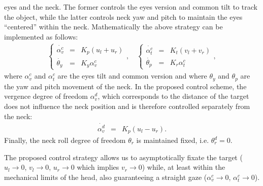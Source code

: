 eyes and the neck. The former controls 
the eyes version and common tilt to track the object, while the latter
controls neck yaw and pitch to maintain the eyes ``centered'' within 
the neck. Mathematically the above strategy can be implemented 
as follows:
%
\begin{eqnarray} \label{Eq:HeadEyeControl}
\left\{\begin{matrix}
\dot {\alpha_v^c} &=&   K_p (u_l + u_r)\\
\dot {\theta_y} &=&   K_y \alpha_v^c 
\end{matrix}
\right.,\quad
\left\{ \begin{matrix}
\dot {\alpha_t^c} &=&   K_t (v_l + v_r)\\
\dot {\theta_p} &=&   K_r \alpha_t^c
\end{matrix} \right.,
\end{eqnarray}
%
where $\alpha_v^c$ and $\alpha_t^c$ are the eyes tilt and common version and 
where $\theta_y$ and $\theta_p$ are the yaw and pitch movement of the neck. 
In the proposed control scheme, the vergence degree of freedom $\alpha_v^d$, 
which corresponds to the distance of the target does not influence 
the neck position and is therefore controlled separately from the neck:
\begin{eqnarray} 
\dot {\alpha_v^d} &=&   K_p (u_l - u_r).
\end{eqnarray}
Finally, the neck roll degree of freedom $\theta_r$ is maintained fixed, 
i.e. $\theta_r^d=0$.

The proposed control strategy allows us to asymptotically fixate the target 
($u_l \rightarrow 0$, $v_l \rightarrow 0$, $u_r \rightarrow 0$ which 
implies $v_r \rightarrow 0$) while, at least within the mechanical limits 
of the head, also guaranteeing a straight gaze 
($\alpha_v^c \rightarrow 0$, $\alpha_t^c \rightarrow 0$). 
